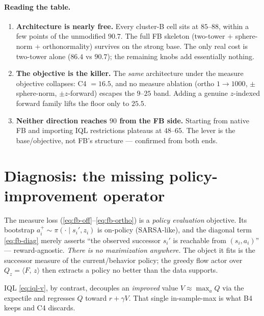 \documentclass[11pt]{article}
\newcommand{\inner}[2]{\langle #1,\, #2\rangle}
\newcommand{\Fmap}{F}                                %
\begin{document}
\paragraph{Reading the table.}
\begin{enumerate}[leftmargin=1.5em,itemsep=2pt]
  \item \textbf{Architecture is nearly free.} Every cluster-B cell sits at
        $85$--$88$, within a few points of the unmodified $90.7$. The full FB
        skeleton (two-tower $+$ sphere-norm $+$ orthonormality) survives on the
        strong base. The only real cost is two-tower alone ($86.4$ vs $90.7$);
        the remaining knobs add essentially nothing.
  \item \textbf{The objective is the killer.} The \emph{same} architecture under
        the measure objective collapses: C4 $=16.5$, and no measure ablation
        (ortho $1{\to}1000$, $\pm$sphere-norm, $\pm z$-forward) escapes the
        $9$--$25$ band. Adding a genuine $z$-indexed forward family lifts the
        floor only to $25.5$.
  \item \textbf{Neither direction reaches $90$ from the FB side.} Starting from
        native FB and importing IQL restrictions plateaus at $48$--$65$. The
        lever is the base/objective, not FB's structure --- confirmed from both
        ends.
\end{enumerate}

\section{Diagnosis: the missing policy-improvement operator}

The measure loss (\ref{eq:fb-off}--\ref{eq:fb-ortho}) is a \emph{policy
evaluation} objective. Its bootstrap $a_i^{+}\sim\pi(\cdot\mid s_i',z_i)$ is
on-policy (SARSA-like), and the diagonal term \eqref{eq:fb-diag} merely asserts
``the observed successor $s_i'$ is reachable from $(s_i,a_i)$'' ---
reward-agnostic. \emph{There is no maximization anywhere.} The object it fits is
the successor measure of the current/behavior policy; the greedy flow actor over
$Q_z=\inner{\Fmap}{z}$ then extracts a policy no better than the data supports.

IQL \eqref{eq:iql-v}, by contrast, decouples an \emph{improved} value $V\approx
\max_a Q$ via the expectile and regresses $Q$ toward $r+\gamma V$. That single
in-sample-max is what B4 keeps and C4 discards.
\end{document}
